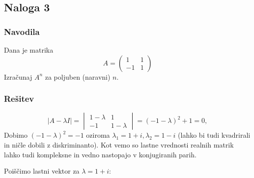 \documentclass{article}
\begin{document}
\subsection*{Naloga 3}
\subsubsection*{Navodila}
Dana je matrika 
\begin{equation*}
A = \begin{pmatrix}
1 & 1 \\
-1  & 1
\end{pmatrix}
\end{equation*}
Izračunaj $A^n$ za poljuben (naravni) $n$.
\subsubsection*{Rešitev}
\begin{equation*}
|A-\lambda I | =
\begin{vmatrix}
1-\lambda & 1 \\
-1  & 1-\lambda
\end{vmatrix} = (-1-\lambda)^2 + 1 = 0,
\end{equation*}
Dobimo $(-1-\lambda)^2 = -1$ oziroma $\lambda_1 = 1+i, \lambda_2 = 1-i$ (lahko bi tudi kvadrirali in ničle dobili z diskriminanto). Kot vemo so lastne vrednosti realnih matrik lahko tudi kompleksne in vedno nastopajo v konjugiranih parih.
\vspace{1em}

\noindent Poiščimo lastni vektor za $\lambda = 1+i$:
\end{document}
